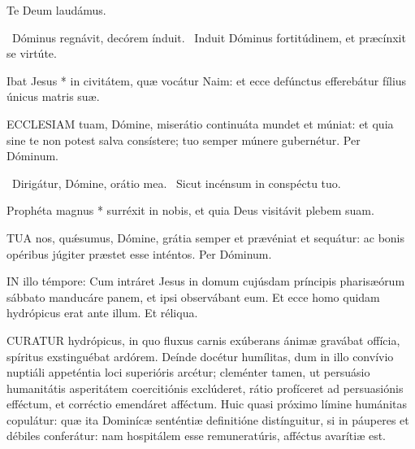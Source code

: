 Te Deum laudámus.


\V\ Dóminus regnávit, decórem índuit. \R\ Induit Dóminus fortitúdinem, et præcínxit se virtúte.

 Ibat Jesus * in civitátem, quæ vocátur Naim: et ecce defúnctus efferebátur fílius únicus matris suæ.


\lettrine[lines=2]{E}{CCLESIAM} tuam, Dómine, miserátio continuáta mundet et múniat: et quia sine te non potest salva consístere; tuo semper múnere gubernétur. Per Dóminum.


\V\ Dirigátur, Dómine, orátio mea. \R\ Sicut incénsum in conspéctu tuo.

 Prophéta magnus * surréxit in nobis, et quia Deus visitávit plebem suam.




\lettrine[lines=2]{T}{UA} nos, quǽsumus, Dómine, grátia semper et prævéniat et sequátur: ac bonis opéribus júgiter præstet esse inténtos. Per Dóminum.




\lettrine[lines=2]{I}{N} illo témpore: Cum intráret Jesus in domum cujúsdam príncipis pharisæórum sábbato manducáre panem, et ipsi observábant eum. Et ecce homo quidam hydrópicus erat ante illum. Et réliqua.



\lettrine[lines=2]{C}{URATUR} hydrópicus, in quo fluxus carnis exúberans ánimæ gravábat offícia, spíritus exstinguébat ardórem. Deínde docétur humílitas, dum in illo convívio nuptiáli appeténtia loci superióris arcétur; cleménter tamen, ut persuásio humanitátis asperitátem coercitiónis exclúderet, rátio profíceret ad persuasiónis efféctum, et corréctio emendáret afféctum. Huic quasi próximo límine humánitas copulátur: quæ ita Dominícæ senténtiæ definitióne distínguitur, si in páuperes et débiles conferátur: nam hospitálem esse remuneratúris, afféctus avarítiæ est.

